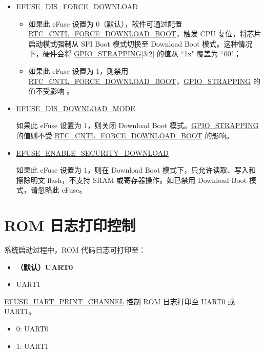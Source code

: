 \documentclass[main\_\_CN.tex]{subfiles}
\begin{document}
\begin{itemize}
    \item \hyperref[fielddesc:EFUSEDISFORCEDOWNLOAD]{EFUSE\_DIS\_FORCE\_DOWNLOAD}
    \begin{itemize}
        \item 如果此 eFuse 设置为 0（默认），软件可通过配置 \hyperref[fielddesc:RTCCNTLFORCEDOWNLOADBOOT]{RTC\_CNTL\_FORCE\_DOWNLOAD\_BOOT}，触发 CPU 复位，将芯片启动模式强制从 SPI Boot 模式切换至 Download Boot 模式。这种情况下，硬件会将 \hyperref[fielddesc:GPIOSTRAPPING]{GPIO\_STRAPPING}[3:2] 的值从 ``1x" 覆盖为 ``00"；
        \item 如果此 eFuse 设置为 1，则禁用 \hyperref[fielddesc:RTCCNTLFORCEDOWNLOADBOOT]{RTC\_CNTL\_FORCE\_DOWNLOAD\_BOOT}，\hyperref[fielddesc:GPIOSTRAPPING]{GPIO\_STRAPPING} 的值不受影响 。 
    \end{itemize}

    \item \hyperref[fielddesc:EFUSEDISDOWNLOADMODE]{EFUSE\_DIS\_DOWNLOAD\_MODE}


如果此 eFuse 设置为 1，则关闭 Download Boot 模式。\hyperref[fielddesc:GPIOSTRAPPING]{GPIO\_STRAPPING} 的值则不受 \hyperref[fielddesc:RTCCNTLFORCEDOWNLOADBOOT]{RTC\_CNTL\_FORCE\_DOWNLOAD\_BOOT} 的影响。
    \item \hyperref[fielddesc:EFUSEENABLESECURITYDOWNLOAD]{EFUSE\_ENABLE\_SECURITY\_DOWNLOAD}
    
    如果此 eFuse 设置为 1，则在 Download Boot 模式下，只允许读取、写入和擦除明文 flash，不支持 SRAM 或寄存器操作。如已禁用 Download Boot 模式，请忽略此 eFuse。
\end{itemize}

\section{ROM 日志打印控制}

系统启动过程中，ROM 代码日志可打印至：

\begin{itemize}
    \item \textbf{（默认）UART0}
    \item UART1
\end{itemize}

\hyperref[fielddesc:EFUSEUARTPRINTCHANNEL]{EFUSE\_UART\_PRINT\_CHANNEL} 控制 ROM 日志打印至 UART0 或 UART1。

\begin{itemize}
    \item 0: UART0
    \item 1: UART1
\end{itemize}
\end{document}

